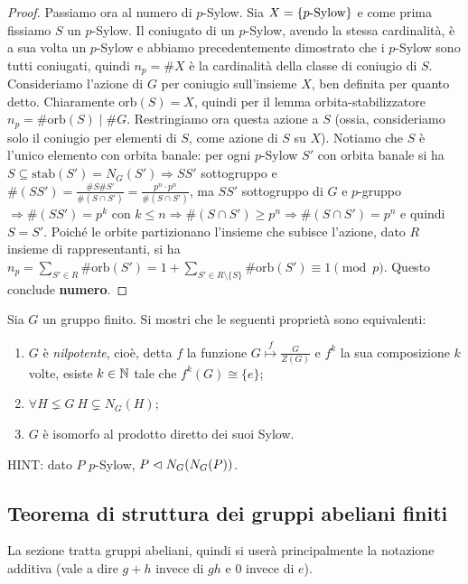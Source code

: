 \begin{proof}
    Passiamo ora al numero di $p$-Sylow. Sia $X = \left\{  p\text{-Sylow} \right\}$ e come prima fissiamo $S$ un $p$-Sylow. Il coniugato di un $p$-Sylow, avendo la stessa cardinalità, è a sua volta un $p$-Sylow e abbiamo precedentemente dimostrato che i $p$-Sylow sono tutti coniugati, quindi $n_p = \#X$ è la cardinalità della classe di coniugio di $S$. Consideriamo l'azione di $G$ per coniugio sull'insieme $X$, ben definita per quanto detto. Chiaramente $\text{orb}(S) = X$, quindi per il lemma orbita-stabilizzatore $n_p = \#\text{orb}(S) \mid \#G$. Restringiamo ora questa azione a $S$ (ossia, consideriamo solo il coniugio per elementi di $S$, come azione di $S$ su $X$). Notiamo che $S$ è l'unico elemento con orbita banale: per ogni $p$-Sylow $S'$ con orbita banale si ha $S \subseteq \text{stab}(S') = N_G(S') \Rightarrow SS'$ sottogruppo e $\#(SS') = \frac{\#S \#S'}{\#(S \cap S')} = \frac{p^n \cdot p^n}{\#(S \cap S')}$, ma $SS'$ sottogruppo di $G$ e $p$-gruppo $\Rightarrow \#(SS') = p^k$ con $k\leq n \Rightarrow \#(S\cap S') \geq p^n \Rightarrow \#(S\cap S') = p^n$ e quindi $S = S'$. Poiché le orbite partizionano l'insieme che subisce l'azione, dato $R$ insieme di rappresentanti, si ha $n_p = \sum_{S' \in R} \#\text{orb}(S') = 1 + \sum_{S' \in R\setminus\{S\}} \#\text{orb}(S') \equiv 1 \pmod{p}$. Questo conclude \textbf{numero}.
\end{proof}

\begin{exercise}
    Sia $G$ un gruppo finito. Si mostri che le seguenti proprietà sono equivalenti:
    \begin{enumerate}[label=$(\roman*)$]
        \item $G$ è \emph{nilpotente}, cioè, detta $f$ la funzione $G \overset{f}{\mapsto} \frac{G}{Z(G)}$ e $f^{k}$ la sua composizione $k$ volte, esiste $k \in \mathbb{N}$ tale che $f^k(G) \cong \{e\}$;
        \item $\forall H \lneq G \ H \subsetneq N_G(H)$;
        \item $G$ è isomorfo al prodotto diretto dei suoi Sylow.
    \end{enumerate}
    \tiny{HINT: dato $P$ $p$-Sylow, $P \vartriangleleft N_G(N_G(P))$.}
\end{exercise}

\subsection{Teorema di struttura dei gruppi abeliani finiti}
La sezione tratta gruppi abeliani, quindi si userà principalmente la notazione additiva (vale a dire $g+h$ invece di $gh$ e $0$ invece di $e$).

